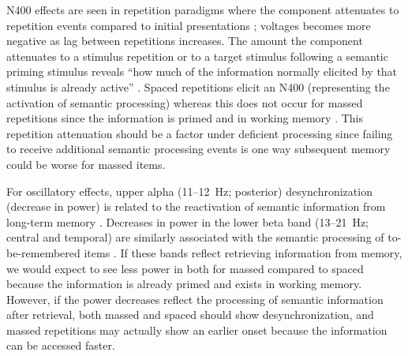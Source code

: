 N400 effects are seen in repetition paradigms where the component attenuates to repetition events compared to initial presentations \cite{KimEtal2001,OlicEtal2000,VanSEtal2007}; voltages becomes more negative as lag between repetitions increases.  \cbstart  The amount the component attenuates to a stimulus repetition or to a target stimulus following a semantic priming stimulus reveals ``how much of the information normally elicited by that stimulus is already active'' \cite[p.~23]{KutaFede2011}.  \cbend  Spaced repetitions elicit an N400 (representing the activation of semantic processing) whereas this does not occur for massed repetitions since the information is primed and in working memory \cite{VanSEtal2007}.  This repetition attenuation should be a factor under deficient processing since failing to receive additional semantic processing events is one way subsequent memory could be worse for massed items.




For oscillatory effects, upper alpha (11--12~Hz; posterior) desynchronization (decrease in power) is related to the reactivation of semantic information from long-term memory \cite{Klim1999,KlimEtal2005}.  Decreases in power in the lower beta band (13--21~Hz; central and temporal) are similarly associated with the semantic processing of to-be-remembered items \cite{FellEtal2013,HansEtal2012,HansEtal2011a}.  If these bands reflect retrieving information from memory, we would expect to see less power in both for massed compared to spaced because the information is already primed and exists in working memory.  However, if the power decreases reflect the processing of semantic information after retrieval, both massed and spaced should show desynchronization, and massed repetitions may actually show an earlier onset because the information can be accessed faster.


